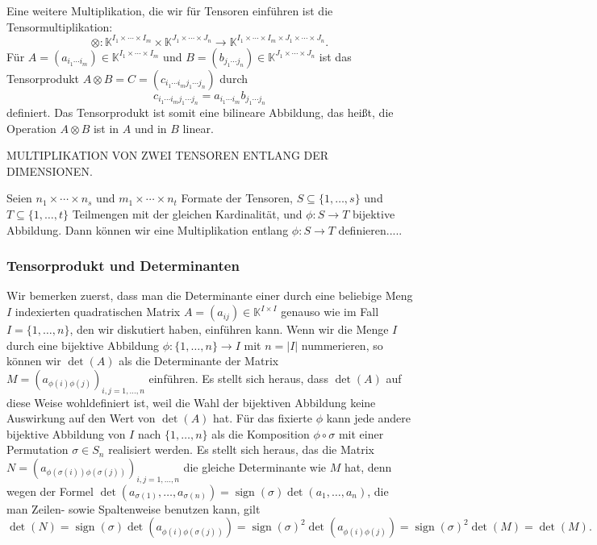 \documentclass[
a4paper,12pt,
bibliography=totocnumbered,
numbers=noenddot,
]{scrartcl}
\numberwithin{equation}{subsection}
\newcommand{\K}{\mathbb K}
\newcommand{\sign}{\operatorname{sign}} %
\theoremstyle{plain}
\theoremstyle{definition}
\begin{document}
Eine weitere Multiplikation, die wir für Tensoren einführen ist die Tensormultiplikation: 
\[
	 \otimes : \K^{I_1 \times \cdots \times I_m} \times \K^{J_1 \times \cdots \times  J_n} \to \K^{I_1 \times \cdots \times I_m \times J_1 \times \cdots \times J_n}. 
\]
Für $A = (a_{i_1\cdots i_m} ) \in \K^{I_1 \times \cdots \times I_m}$ und 
$B = (b_{j_1 \cdots j_n}) \in \K^{J_1 \times \cdots \times J_n}$ ist das Tensorprodukt $A \otimes B  =  C = (c_{i_1 \cdots i_m j_1 \cdots j_n})$ durch 
\[
	c_{i_1 \cdots i_m j_1 \cdots j_n} = a_{i_1 \cdots i_m} b_{j_1 \cdots j_n}
\]
definiert. Das Tensorprodukt ist somit eine bilineare Abbildung, das heißt, die Operation $A \otimes B$ ist in $A$ und in $B$ linear. 


MULTIPLIKATION VON ZWEI TENSOREN ENTLANG DER DIMENSIONEN. 

Seien $n_1 \times \cdots \times n_s$ und $m_1 \times \cdots \times n_t$ Formate der Tensoren, $S \subseteq \{1,\ldots, s\}$ und $T \subseteq \{1,\ldots, t\}$ Teilmengen mit der gleichen Kardinalität, und $\phi : S \to T$ bijektive Abbildung. Dann können wir eine Multiplikation entlang $\phi : S \to T$ definieren..... 

\subsubsection{Tensorprodukt und Determinanten} 

Wir bemerken zuerst, dass man die Determinante einer durch eine beliebige Meng $I$ indexierten quadratischen Matrix $A = (a_{ij}) \in \K^{I \times I}$ genauso wie im Fall $I = \{1,\ldots, n\}$, den wir diskutiert haben, einführen kann. Wenn wir die Menge $I$ durch eine bijektive Abbildung $ \phi :  \{1,\ldots,n\} \to I$ mit $n = |I|$ nummerieren, so können wir $\det(A)$ als die Determinante der Matrix $M = ( a_{\phi(i) \phi(j)} )_{i,j =1,\ldots, n}$ einführen. Es stellt sich heraus, dass $\det(A)$ auf diese Weise wohldefiniert ist, weil die Wahl der bijektiven Abbildung keine Auswirkung auf den Wert von $\det(A)$ hat. Für das fixierte $\phi$ kann jede andere bijektive Abbildung von $I$ nach $\{1,\ldots,n\}$ als die Komposition $\phi \circ \sigma$ mit einer Permutation $\sigma \in S_n$ realisiert werden. Es stellt sich heraus, das die Matrix $N = ( a_{\phi(\sigma(i)) \phi(\sigma(j))} )_{i,j=1,\ldots,n}$ die gleiche Determinante wie $M$ hat, denn wegen der Formel $\det(a_{\sigma(1)},\ldots,a_{\sigma(n)}) = \sign(\sigma) \det(a_1,\ldots,a_n)$, die man Zeilen- sowie Spaltenweise benutzen kann, gilt 
\[
	\det(N) = \sign(\sigma) \det ( a_{\phi(i) \phi(\sigma(j))} ) = \sign(\sigma)^2 
	\det( a_{\phi(i) \phi(j)} ) = \sign(\sigma)^2 \det(M) = \det(M). 
\] 
\end{document}

